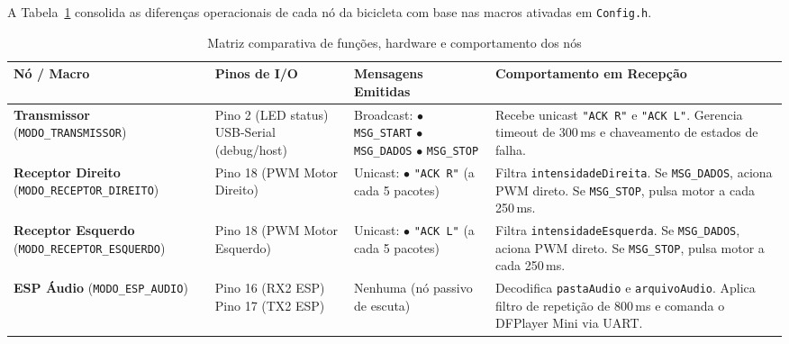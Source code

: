\documentclass[12pt,a4paper]{article}
\begin{document}
A Tabela~\ref{tab:resumo_modos} consolida as diferenças operacionais de cada nó da bicicleta com base nas macros ativadas em \texttt{Config.h}.

\begin{table}[H]
    \centering
    \caption{Matriz comparativa de funções, hardware e comportamento dos nós}
    \label{tab:resumo_modos}
    \small
    \begin{tabularx}{\textwidth}{p{2.6cm}p{3.2cm}p{3.2cm}X}
        \toprule
        \textbf{Nó / Macro} & \textbf{Pinos de I/O} & \textbf{Mensagens Emitidas} & \textbf{Comportamento em Recepção} \\
        \midrule
        \textbf{Transmissor} \newline (\texttt{MODO\_TRANSMISSOR}) & 
        Pino 2 (LED status) \newline USB-Serial (debug/host) & 
        Broadcast: \newline
        $\bullet$ \texttt{MSG\_START} \newline
        $\bullet$ \texttt{MSG\_DADOS} \newline
        $\bullet$ \texttt{MSG\_STOP} & 
        Recebe unicast \texttt{"ACK R"} e \texttt{"ACK L"}. Gerencia timeout de 300\,ms e chaveamento de estados de falha. \\
        \addlinespace
        \textbf{Receptor Direito} \newline (\texttt{MODO\_RECEPTOR\_DIREITO}) & 
        Pino 18 (PWM Motor Direito) & 
        Unicast: \newline
        $\bullet$ \texttt{"ACK R"} (a cada 5 pacotes) & 
        Filtra \texttt{intensidadeDireita}. Se \texttt{MSG\_DADOS}, aciona PWM direto. Se \texttt{MSG\_STOP}, pulsa motor a cada 250\,ms. \\
        \addlinespace
        \textbf{Receptor Esquerdo} \newline (\texttt{MODO\_RECEPTOR\_ESQUERDO}) & 
        Pino 18 (PWM Motor Esquerdo) & 
        Unicast: \newline
        $\bullet$ \texttt{"ACK L"} (a cada 5 pacotes) & 
        Filtra \texttt{intensidadeEsquerda}. Se \texttt{MSG\_DADOS}, aciona PWM direto. Se \texttt{MSG\_STOP}, pulsa motor a cada 250\,ms. \\
        \addlinespace
        \textbf{ESP Áudio} \newline (\texttt{MODO\_ESP\_AUDIO}) & 
        Pino 16 (RX2 ESP) \newline
        Pino 17 (TX2 ESP) & 
        Nenhuma (nó passivo de escuta) & 
        Decodifica \texttt{pastaAudio} e \texttt{arquivoAudio}. Aplica filtro de repetição de 800\,ms e comanda o DFPlayer Mini via UART. \\
        \bottomrule
    \end{tabularx}
\end{table}
\end{document}
